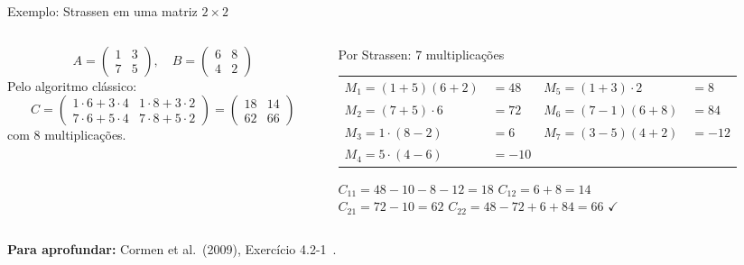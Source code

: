 \documentclass[aspectratio=169,xcolor=table]{beamer}
\newcommand{\fonte}[1]{%
  \vfill
  {\tiny\color{gray!55!black}\textbf{Para aprofundar:} #1\par}%
}
\begin{document}
\begin{frame}{Exemplo: Strassen em uma matriz $2\times 2$}
  \begin{columns}[T]
    \begin{column}{0.4\textwidth}
      \scriptsize
      \[
        A=\begin{pmatrix}1&3\\7&5\end{pmatrix},\quad
        B=\begin{pmatrix}6&8\\4&2\end{pmatrix}
      \]
      Pelo algoritmo clássico:
      \[
        C=\begin{pmatrix}1\cdot6+3\cdot4 & 1\cdot8+3\cdot2\\ 7\cdot6+5\cdot4 & 7\cdot8+5\cdot2\end{pmatrix}
         =\begin{pmatrix}18&14\\62&66\end{pmatrix}
      \]
      com 8 multiplicações.
    \end{column}
    \begin{column}{0.56\textwidth}
      \begin{exampleblock}{Por Strassen: 7 multiplicações}
        \scriptsize
        \begin{tabular}{@{}l@{\;}l@{\qquad}l@{\;}l@{}}
          $M_1=(1+5)(6+2)$ & $=48$  & $M_5=(1+3)\cdot 2$ & $=8$\\
          $M_2=(7+5)\cdot 6$ & $=72$ & $M_6=(7-1)(6+8)$ & $=84$\\
          $M_3=1\cdot(8-2)$ & $=6$  & $M_7=(3-5)(4+2)$ & $=-12$\\
          $M_4=5\cdot(4-6)$ & $=-10$ & & \\
        \end{tabular}
        \smallskip

        $C_{11}=48-10-8-12=18$ \qquad $C_{12}=6+8=14$\\
        $C_{21}=72-10=62$ \qquad\quad\; $C_{22}=48-72+6+84=66$ \;$\checkmark$
      \end{exampleblock}
    \end{column}
  \end{columns}
  \fonte{Cormen et al.\ (2009), Exercício 4.2-1~\cite{cormen2009introduction}.}
\end{frame}
\end{document}
